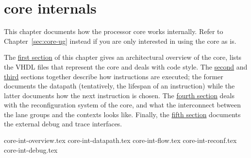 \chapter{\rvex{} core internals}
\label{sec:core-int}

This chapter documents how the \rvex{} processor core works internally. Refer to
Chapter~\ref{sec:core-ug} instead if you are only interested in using the core
as is.

The \hyperref[sec:core-int-overview]{first section} of this chapter gives an 
architectural overview of the core, lists the VHDL files that represent the 
core and deals with code style. The \hyperref[sec:core-int-datapath]{second} and 
\hyperref[sec:core-int-flow]{third} sections together describe how instructions 
are executed; the former documents the datapath (tentatively, the lifespan of an 
instruction) while the latter documents how the next instruction is chosen. The 
\hyperref[sec:core-int-reconf]{fourth section} deals with the reconfiguration 
system of the core, and what the interconnect between the lane groups and the 
contexts looks like. Finally, the \hyperref[sec:core-int-debug]{fifth section} 
documents the external debug and trace interfaces.

{core-int-overview.tex}
{core-int-datapath.tex}
{core-int-flow.tex}
{core-int-reconf.tex}
{core-int-debug.tex}
